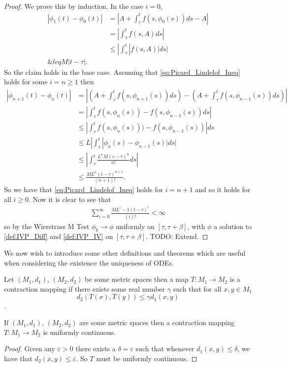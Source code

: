 \documentclass{unswmaths}
\begin{document}
\begin{proof}
	We prove this by induction.
	In the case $ i = 0 $,
	\begin{align*}
		|\phi_1 (t) - \phi_0 (t)| 
		&= | A + \int_\tau^t f(s, \phi_0(s))ds - A | \\
		&= | \int_\tau^t f(s, A) ds | \\
		&\leq |\int_\tau^t |f(s,A)|ds | \\
		\&leq M|t - \tau|.
	\end{align*}
	So the claim holds in the base case.
	Assuming that \eqref{eq:Picard_Lindelof_Ineq} holds for some $ i = n \geq 1$ then
	\begin{align*}
		|\phi_{n+1}(t) - \phi_{n}(t) | &= | \left(A +\int_\tau^t f(s,\phi_{n+1}(s)) ds\right) - \left(A + \int_\tau^t f(s, \phi_{n-1}(s)) ds \right) | \\
		&= | \int_\tau^t f(s, \phi_n(s)) - f(s, \phi_{n-1}(s)) ds | \\
		&\leq | \int_\tau^t f(s, \phi_n(s))) - f(s, \phi_{n-1}(s)) | ds \\
		&\leq L | \int_\tau^t |\phi_n(s) - \phi_{n-1}(s)| ds | \\
		&\leq | \int^t_\tau \frac{L^nM(s-\tau)^n}{n!} ds| \\
		&\leq \frac{ML^n(t-\tau)^{n+1}}{(n+1)!}.
	\end{align*}
	So we have that \eqref{eq:Picard_Lindelof_Ineq} holds for $ i = n + 1 $ and so it holds for all $ i \geq 0 $.
	Now it is clear to see that
	\begin{align*}
		\sum_{i=0}^\infty \frac{ML^i-1(t - \tau)^{i}}{(i)!} < \infty
	\end{align*}
	so by the Wierstrass M Test $ \phi_{k} \longrightarrow \phi $ uniformly on $ [\tau, \tau + \beta] $,
	with $ \phi $ a solution to \eqref{def:IVP_Diff} and \eqref{def:IVP_IV} on $ [\tau, \tau + \beta] $.
	TODO: Extend.
\end{proof}

We now wish to introduce some other definitions and theorems which are useful when considering the
existence the uniqueness of ODEs.
\begin{unswdef}
	\label{def:Ctr_Map}
	Let $ (M_1,d_1) $, $ (M_2, d_2) $ be some metric spaces then a map $ T : M_1 \longrightarrow M_2 $ is
	a contraction mapping if there exists some real number $ \gamma $ such that for all $ x, y \in M_1 $
	$$ d_2(T(x), T(y)) \leq \gamma d_1(x,y) $$.
\end{unswdef}

\begin{unswlem}
	\label{lem:Cont_Ctr_Map}
	If $ (M_1,d_1) $, $ (M_2, d_2) $ are some metric spaces then a contraction mapping 
	$ T:M_1 \longrightarrow M_2 $ is uniformly continuous. 
\end{unswlem}
\begin{proof}
	Given any $ \varepsilon > 0 $ there exists a $ \delta = \varepsilon $ such that whenever
	$ d_1 (x, y) \leq \delta $, we have that $ d_2(x,y) \leq \varepsilon $. So $ T $ must be uniformly
	continuous.
\end{proof}
\end{document}
